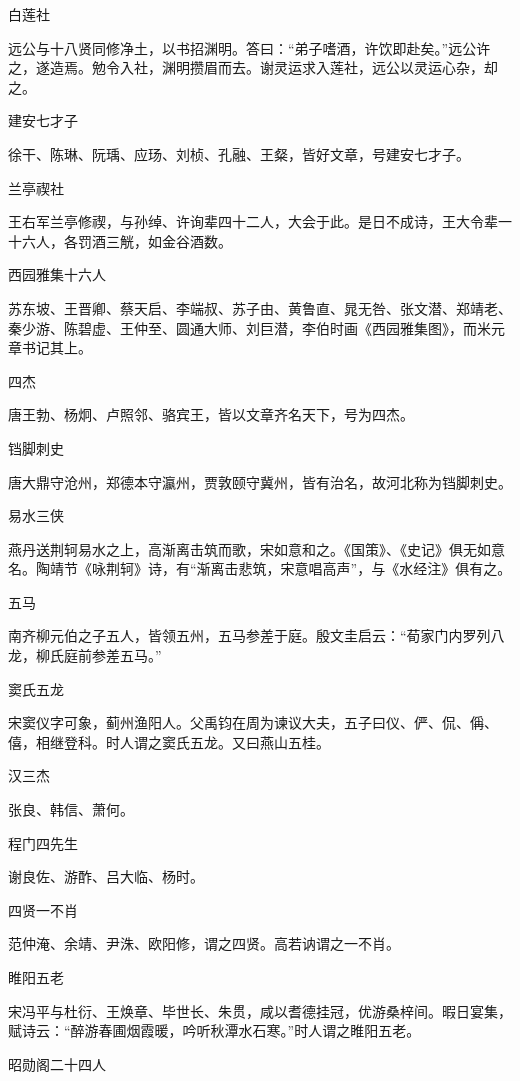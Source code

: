 \documentclass[a4paper,12pt,UTF8,twoside]{ctexbook}
\begin{document}
    白莲社
    
    远公与十八贤同修净土，以书招渊明。答曰：“弟子嗜酒，许饮即赴矣。”远公许之，遂造焉。勉令入社，渊明攒眉而去。谢灵运求入莲社，远公以灵运心杂，却之。
    
    建安七才子
    
    徐干、陈琳、阮瑀、应玚、刘桢、孔融、王粲，皆好文章，号建安七才子。
    
    兰亭禊社
    
    王右军兰亭修禊，与孙绰、许询辈四十二人，大会于此。是日不成诗，王大令辈一十六人，各罚酒三觥，如金谷酒数。
    
    西园雅集十六人
    
    苏东坡、王晋卿、蔡天启、李端叔、苏子由、黄鲁直、晁无咎、张文潜、郑靖老、秦少游、陈碧虚、王仲至、圆通大师、刘巨潜，李伯时画《西园雅集图》，而米元章书记其上。
    
    四杰
    
    唐王勃、杨炯、卢照邻、骆宾王，皆以文章齐名天下，号为四杰。
    
    铛脚刺史
    
    唐大鼎守沧州，郑德本守瀛州，贾敦颐守冀州，皆有治名，故河北称为铛脚刺史。
    
    易水三侠
    
    燕丹送荆轲易水之上，高渐离击筑而歌，宋如意和之。《国策》、《史记》俱无如意名。陶靖节《咏荆轲》诗，有“渐离击悲筑，宋意唱高声”，与《水经注》俱有之。
    
    五马
    
    南齐柳元伯之子五人，皆领五州，五马参差于庭。殷文圭启云：“荀家门内罗列八龙，柳氏庭前参差五马。”
    
    窦氏五龙
    
    宋窦仪字可象，蓟州渔阳人。父禹钧在周为谏议大夫，五子曰仪、俨、侃、偁、僖，相继登科。时人谓之窦氏五龙。又曰燕山五桂。
    
    汉三杰
    
    张良、韩信、萧何。
    
    程门四先生
    
    谢良佐、游酢、吕大临、杨时。
    
    四贤一不肖
    
    范仲淹、余靖、尹洙、欧阳修，谓之四贤。高若讷谓之一不肖。
    
    睢阳五老
    
    宋冯平与杜衍、王焕章、毕世长、朱贯，咸以耆德挂冠，优游桑梓间。暇日宴集，赋诗云：“醉游春圃烟霞暖，吟听秋潭水石寒。”时人谓之睢阳五老。
    
    昭勋阁二十四人
    
\end{document}
